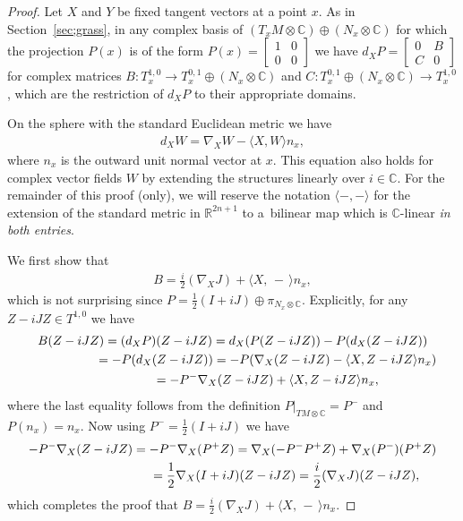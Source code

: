 \documentclass[10pt,a4paper]{amsart}
\numberwithin{equation}{section}
\newcommand{\R}{\mathbb{R}}
\newcommand{\CC}{\mathbb{C}}
\begin{document}
\begin{proof} Let $X$ and $Y$ be fixed tangent vectors at a point $x$. As in Section~\ref{sec;grass}, in any complex basis of $(T_xM \otimes \CC) \oplus (N_x \otimes \CC)$ for which the projection $P(x)$ is of the form
$P(x) = \left[\begin{smallmatrix}
1 & 0 \\
0& 0
\end{smallmatrix}\right]$ we have
$d_X P =\left[
\begin{smallmatrix}
0 & B \\
C& 0
\end{smallmatrix}\right] $ for complex matrices $B\colon T^{1,0}_x \to T^{0,1}_x \oplus ( N_x \otimes \CC )$ and $C \colon T^{0,1}_x \oplus ( N_x \otimes \CC ) \to T^{1,0}_x$, which are the restriction of $d_X P$ to their appropriate domains.

On the sphere with the standard Euclidean metric we have
\begin{gather} \label{eq;NablaSphere}
d_X W = \nabla_X W - \langle X,W \rangle n_x,
\end{gather}
where $n_x$ is the outward unit normal vector at $x$. This equation also holds for complex vector fields $W$ by extending the structures linearly over $i \in \CC$. For the remainder of this proof (only), we will reserve the notation $ \langle - , - \rangle$ for the extension of the standard metric in $\R^{2n+1}$ to a~bilinear map which is $\CC$-linear \emph{in both entries}.

We first show that
\begin{gather*}
B= \frac i 2 (\nabla_X J) + \langle X , \, -\, \rangle n_x,
\end{gather*}
which is not surprising since $P = \frac 1 2 (I + i J) \oplus \pi_{N_x \otimes \CC}$.
Explicitly, for any $Z - i JZ \in T^{1,0} $ we have
\begin{gather*}
B(Z-iJZ) = (d_XP)(Z-iJZ) = d_X(P(Z - iJZ)) - P(d_X(Z-iJZ)) \\
\hphantom{B(Z-iJZ)}{} = - P(d_X(Z-iJZ)) = -P ( \nabla_X (Z-iJZ) - \langle X,Z - iJZ \rangle n_x )\\
\hphantom{B(Z-iJZ)}{}= - P^- \nabla_X (Z-iJZ) + \langle X,Z - iJZ \rangle n_x ,
\end{gather*}
where the last equality follows from the definition $P\big|_{TM \otimes \CC} = P^- $ and $P(n_x) = n_x$. Now using $P^- = \frac 1 2 (I + i J)$ we have
\begin{gather*}
 -P^- \nabla_X (Z-iJZ) = -P^- \nabla_X (P^+ Z) = \nabla_X ( -P^- P^+ Z) + \nabla_X (P^-) (P^+ Z) \\
 \hphantom{-P^- \nabla_X (Z-iJZ)}{} =\frac 1 2 \nabla_X (I +iJ) (Z-iJZ) = \frac i 2 (\nabla_X J )(Z- i J Z),
\end{gather*}
which completes the proof that $B= \frac i 2 (\nabla_X J) + \langle X , \, -\, \rangle n_x$.


\end{proof}
\end{document}
